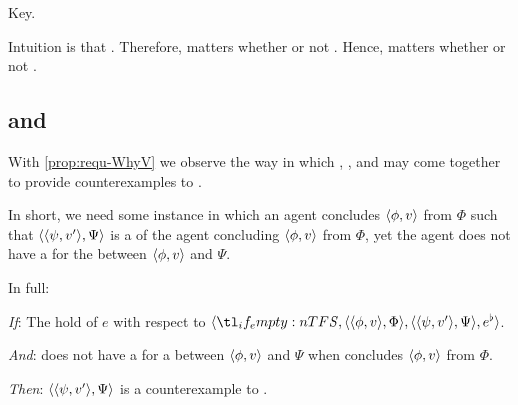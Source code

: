 \begin{note}
  Key.

  Intuition is that \tC{}.
  Therefore, matters whether or not \fc{}.
  Hence, matters whether or not \ros{}.
\end{note}

\subsection{ and \issueConstraint{}}
\label{cha:binding:sec:requ-iC}

\begin{note}
  With \autoref{prop:requ-WhyV} we observe the way in which , , and  may come together to provide counterexamples to \issueConstraint{}.

  In short, we need some instance in which an agent concludes \(\langle \phi, v \rangle\) from \(\Phi\) such that \(\langle \langle \psi, v' \rangle, \Psi \rangle\) is a \requ{} of the agent concluding \(\langle \phi, v \rangle\) from \(\Phi\), yet the agent does not have a \wit{} for the \ros{} between \(\langle \phi, v \rangle\) and \(\Psi\).

  In full:

  \begin{proposition}
    \label{prop:requ-WhyV-ces}

    \begin{itenum}
    \item[\emph{If}:]
      The  hold of \(e\) with respect to \(\langle \vAgent{}, \pvp{\phi}{v}{\Phi}, \pvp{\psi}{v'}{\Psi}, e^{\flat} \rangle\).
    \item[\emph{And}:]
      \label{prop:requ-WhyVCes:noW}
      \vAgent{} does not have a \wit{} for a \ros{} between \(\langle \phi, v \rangle\) and \(\Psi\) when \vAgent{} concludes \(\langle \phi, v \rangle\) from \(\Phi\).
    \item[\emph{Then}:]
      \(\langle \langle \psi, v' \rangle, \Psi \rangle\) is a counterexample to \issueConstraint{}.
    \end{itenum}
    \vspace{-\baselineskip}
  \end{proposition}


\end{note}
